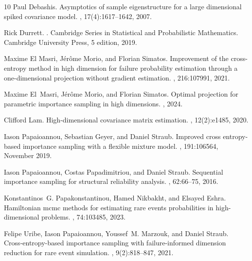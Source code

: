 \documentclass[]{article}
\theoremstyle{plain}
\theoremstyle{definition}
\begin{document}
\begin{thebibliography}{10}
Paul Debashis.
\newblock Asymptotics of sample eigenstructure for a large dimensional spiked
  covariance model.
, 17(4):1617--1642, 2007.

Rick Durrett.
.
\newblock Cambridge Series in Statistical and Probabilistic Mathematics.
  Cambridge University Press, 5 edition, 2019.

Maxime {El Masri}, J{\'e}r{\^o}me Morio, and Florian Simatos.
\newblock Improvement of the cross-entropy method in high dimension for failure
  probability estimation through a one-dimensional projection without gradient
  estimation.
, 216:107991, 2021.

Maxime El~Masri, J{\'e}r{\^o}me Morio, and Florian Simatos.
\newblock Optimal projection for parametric importance sampling in high
  dimensions.
, 2024.

Clifford Lam.
\newblock High-dimensional covariance matrix estimation.
, 12(2):e1485, 2020.

Iason Papaioannou, Sebastian Geyer, and Daniel Straub.
\newblock Improved cross entropy-based importance sampling with a flexible
  mixture model.
, 191:106564, November
  2019.

Iason Papaioannou, Costas Papadimitriou, and Daniel Straub.
\newblock Sequential importance sampling for structural reliability analysis.
, 62:66--75, 2016.

Konstantinos~G. Papakonstantinou, Hamed Nikbakht, and Elsayed Eshra.
\newblock Hamiltonian mcmc methods for estimating rare events probabilities in
  high-dimensional problems.
, 74:103485, 2023.

Felipe Uribe, Iason Papaioannou, Youssef~M. Marzouk, and Daniel Straub.
\newblock Cross-entropy-based importance sampling with failure-informed
  dimension reduction for rare event simulation.
, 9(2):818--847,
  2021.

\end{thebibliography}
\end{document}
